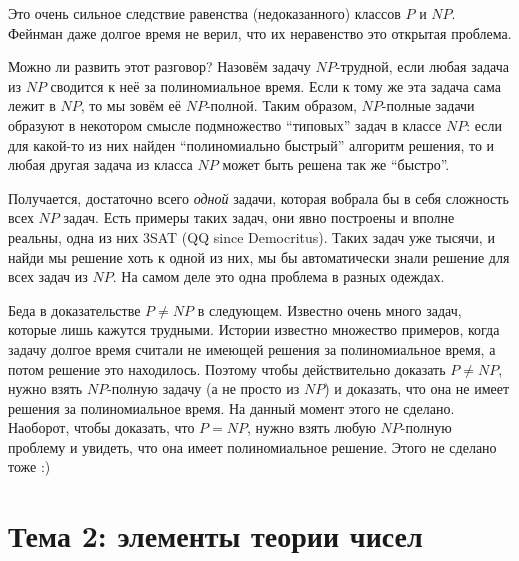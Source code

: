 \documentclass[12pt]{article}
\begin{document}
Это очень сильное следствие равенства (недоказанного) классов $P$ и $NP$. Фейнман даже долгое время не верил, что их неравенство это открытая проблема. 

Можно ли развить этот разговор? Назовём задачу $NP$-трудной, если любая задача из $NP$ сводится к неё за полиномиальное время. Если к тому же эта задача сама лежит в $NP$, то мы зовём её $NP$-полной. Таким образом, $NP$-полные задачи образуют в некотором смысле подмножество ``типовых'' задач в классе $NP$: если для какой-то из них найден ``полиномиально быстрый'' алгоритм решения, то и любая другая задача из класса $NP$ может быть решена так же ``быстро''. 

Получается, достаточно всего {\it одной} задачи, которая вобрала бы в себя сложность всех $NP$ задач. Есть примеры таких задач, они явно построены и вполне реальны, одна из них 3SAT (QQ since Democritus). Таких задач уже тысячи, и найди мы решение хоть к одной из них, мы бы автоматически знали решение для всех задач из $NP$.  На самом деле это одна проблема в разных одеждах. 

Беда в доказательстве $P \neq NP$ в следующем. Известно очень много задач, которые лишь кажутся трудными. Истории известно множество примеров, когда задачу долгое время считали не имеющей решения за полиномиальное время, а потом решение это находилось. Поэтому чтобы действительно доказать $P \neq NP$, нужно взять $NP$-полную задачу (а не просто из $NP$) и доказать, что она не имеет решения за полиномиальное время. На данный момент этого не сделано. Наоборот, чтобы доказать, что $P = NP$, нужно взять любую $NP$-полную проблему и увидеть, что она имеет полиномиальное решение. Этого не сделано тоже :)


\section*{Тема 2: элементы теории чисел}
\end{document}
